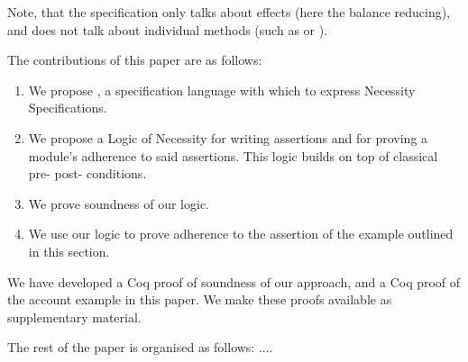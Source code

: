  Note, that the specification only talks about effects (here the balance reducing), and does not
 talk about individual methods (such as  or ).
 
   
 The contributions of this paper are as follows:
 
 \begin{enumerate}
 \item
 We propose \Chainmail, a specification language with which to
express Necessity Specifications. 
 \item
  We propose a Logic of Necessity for writing assertions and for proving a module's adherence to said assertions.
 This logic builds on top of classical pre- post- conditions.
 \item
 We prove soundness of our logic.  
 \item
 We use our logic to prove adherence to the assertion of the example
outlined  in this section.
 \end{enumerate}
 
 We have developed a Coq proof of soundness of our approach, and a Coq proof of the
 account example in this paper. We make these proofs available as supplementary material.


The rest of the paper is organised as follows: .... 




